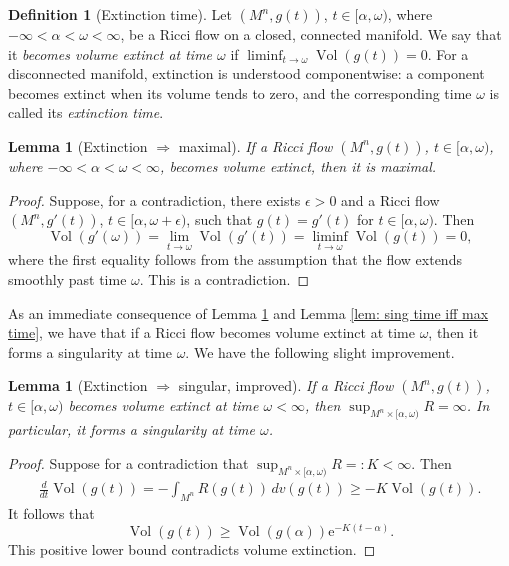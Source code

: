 \documentclass[11pt]{article}
\theoremstyle{plain}
\newtheorem{lemma}[theorem]{Lemma}
\theoremstyle{definition}
\newtheorem{definition}[theorem]{Definition}
\theoremstyle{remark}
\newcommand{\E}{\mathrm{e}}
\newcommand{\Vol}{\operatorname{Vol}}
\begin{document}
\begin{definition}[Extinction time]
    Let $(M^n,g(t))$, $t\in [\alpha,\omega)$, where $-\infty < \alpha < \omega < \infty$, be a Ricci flow on a closed, connected manifold.
    We say that it \emph{becomes volume extinct at time $\omega$} if $\liminf_{t\to\omega} \Vol (g(t))=0 $.
For a disconnected manifold, extinction is understood componentwise:
a component becomes extinct when its volume tends to zero, and the corresponding time $\omega$ is called its \emph{extinction time}.
\end{definition}

\begin{lemma}[Extinction $\Rightarrow$ maximal]
\label{lem: vol extinct implies max}
    If a Ricci flow $(M^n,g(t))$, $t\in [\alpha,\omega)$, where $-\infty < \alpha < \omega < \infty$, becomes volume extinct, then it is maximal.
\end{lemma}

\begin{proof}
    Suppose, for a contradiction, there exists $\epsilon >0$ and a Ricci flow $(M^n,g'(t))$, $t\in [\alpha,\omega+\epsilon)$, such that $g(t)=g'(t)$ for $t\in [\alpha,\omega)$.
Then
\begin{equation}
    \Vol (g'(\omega)) = \lim_{t\to \omega} \Vol (g'(t)) = \liminf_{t\to\omega} \Vol (g(t))=0,
\end{equation}
where the first equality follows from the assumption that the flow extends smoothly past time $\omega$.
This is a contradiction.
\end{proof}

As an immediate consequence of Lemma \ref{lem: vol extinct implies max} and Lemma \ref{lem: sing time iff max time}, we have that if a Ricci flow becomes volume extinct at time $\omega$, then it forms a singularity at time $\omega$.
We have the following slight improvement.

\begin{lemma}[Extinction $\Rightarrow$ singular, improved]
    If a Ricci flow $(M^n,g(t))$, $t\in [\alpha,\omega)$ becomes volume extinct at time $\omega<\infty$, then $\sup_{M^n \times [\alpha,\omega)}R=\infty$.
    In particular, it forms a singularity at time $\omega$.
\end{lemma}

\begin{proof}
Suppose for a contradiction that 
$\sup_{M^n \times [\alpha,\omega)}R=:K <\infty$.
Then 
\begin{align}
    \frac{d}{dt} \Vol (g(t)) = -\int_{M^n} R(g(t)) \, dv(g(t)) \geq - K \Vol (g(t))  . 
\end{align}
It follows that
\begin{equation}
    \Vol (g(t)) \geq \Vol (g(\alpha)) \E^{-K(t-\alpha)} .
\end{equation}
This positive lower bound contradicts volume extinction.
\end{proof}



\end{document}
